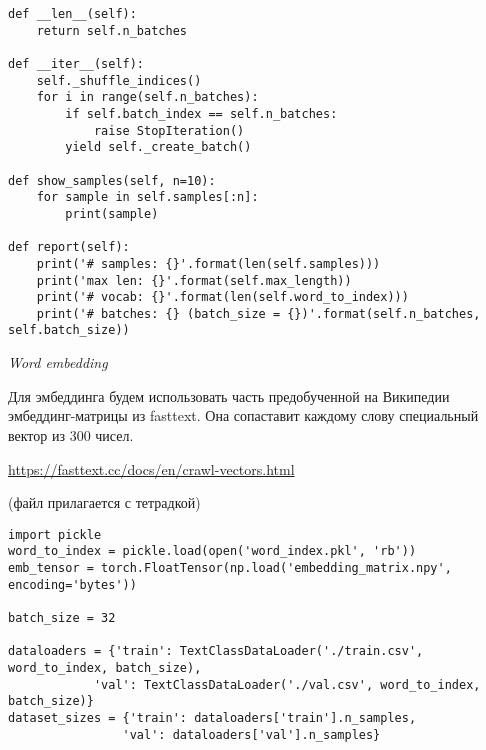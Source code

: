 \begin{verbatim}
def __len__(self):
    return self.n_batches

def __iter__(self):
    self._shuffle_indices()
    for i in range(self.n_batches):
        if self.batch_index == self.n_batches:
            raise StopIteration()
        yield self._create_batch()

def show_samples(self, n=10):
    for sample in self.samples[:n]:
        print(sample)

def report(self):
    print('# samples: {}'.format(len(self.samples)))
    print('max len: {}'.format(self.max_length))
    print('# vocab: {}'.format(len(self.word_to_index)))
    print('# batches: {} (batch_size = {})'.format(self.n_batches, self.batch_size))
\end{verbatim}

\textit{Word embedding}

Для эмбеддинга будем использовать часть предобученной на Википедии эмбеддинг-матрицы из fasttext. Она сопаставит каждому слову специальный вектор из 300 чисел.

\url{https://fasttext.cc/docs/en/crawl-vectors.html}

(файл прилагается с тетрадкой)

\begin{verbatim}
import pickle
word_to_index = pickle.load(open('word_index.pkl', 'rb'))
emb_tensor = torch.FloatTensor(np.load('embedding_matrix.npy', encoding='bytes'))

batch_size = 32

dataloaders = {'train': TextClassDataLoader('./train.csv', word_to_index, batch_size), 
            'val': TextClassDataLoader('./val.csv', word_to_index, batch_size)}
dataset_sizes = {'train': dataloaders['train'].n_samples, 
                'val': dataloaders['val'].n_samples}
\end{verbatim}

